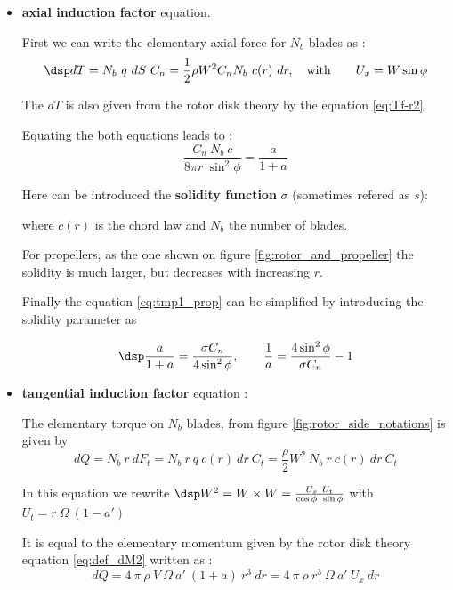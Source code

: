 \begin{itemize}

\item  \textbf{axial induction factor} equation.

First we can write the elementary axial force   for $N_b$ blades as :
$$ \dsp
dT = N_b~q~dS~C_n = \frac{1}{2} \rho W^2 C_n  N_b~c(r)~dr, \quad {\rm with}\qquad U_x = W \sin\phi 
$$

The  $dT$ is also given from the rotor disk theory by the
equation \eqref{eq:Tf-r2}  

Equating the both  equations leads to :
\begin{equation}
\frac{C_n~N_b~c}{8 \pi r ~\sin^2\phi} =  \frac{a}{1+a}  
\label{eq:tmp1_prop}
\end{equation}


Here can be introduced the
\textbf{solidity function}  $\sigma$ (sometimes refered as $s$): 

where $c(r)$ is the chord law and $N_b$ the number of blades.


For propellers, as the one shown on figure   \ref{fig:rotor_and_propeller} the solidity is much larger, but
decreases with increasing $r$.



Finally the equation \eqref{eq:tmp1_prop} can be simplified 
by introducing the solidity parameter as  

\begin{equation} \dsp \dfrac{a}{1+a} = \dfrac{\sigma C_n}{4 \sin^2\phi}, \qquad
  \dfrac{1}{a} =  \dfrac{4 \sin^2\phi}{\sigma C_n}  - 1
  \label{eq:a_prop}\end{equation} 

\item  \textbf{tangential induction factor} equation :


The elementary torque on $N_b$ blades,
 from figure \ref{fig:rotor_side_notations} is given by 
$$
dQ = N_b~r~dF_t = N_b~r~q~c(r)~dr~C_t = \frac{\rho}{2} W^2~N_b~r~c(r)~dr~C_t
$$

In this equation we rewrite 
$\dsp W^2 = W\times W  =  \frac{U_x~U_t}{\cos\phi~\sin\phi}$ with
$U_t = r~\Omega~(1-a')$

It is equal to the elementary momentum given by the rotor disk theory equation
\eqref{eq:def_dM2} written as :
$$
dQ =  4 \  \pi \ \rho \ V \ \Omega \  a' \ (1+a)  \ r^3~dr= 4~\pi~\rho~r^3~\Omega~a'~U_x~dr
$$



\end{itemize}

